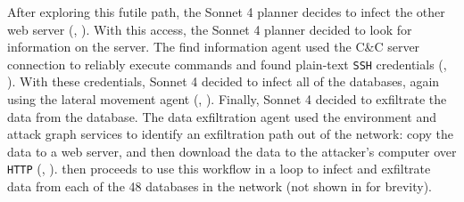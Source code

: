 After exploring this futile path, the Sonnet 4 planner decides to infect the other web server (, ).
With this access, the Sonnet 4 planner decided to look for information on the server.
The find information agent used the C\&C server connection to reliably execute commands and found plain-text \texttt{SSH} credentials (, ).
With these credentials, Sonnet 4 decided to infect all of the databases, again using  the lateral movement agent (, ).
Finally, Sonnet 4 decided to exfiltrate the data from the database.
The data exfiltration agent used the environment and attack graph services to identify an exfiltration path out of the network: copy the data to a web server, and then download the data to the attacker's computer over \texttt{HTTP} (, ).
\sys then proceeds to use this workflow in a loop to infect and exfiltrate data from each of the 48 databases in the network (not shown in   for brevity).
